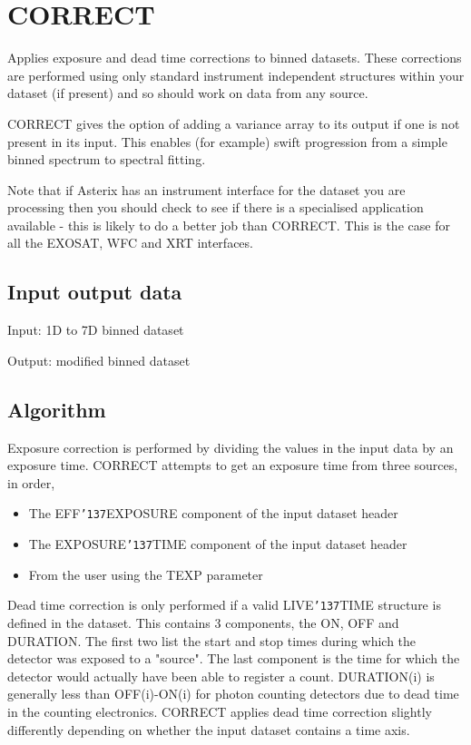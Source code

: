 \documentclass{book}
\renewcommand{\_}{{\tt\char'137}}     %
\begin{document}
\section{CORRECT}
Applies exposure and dead time corrections to binned datasets. These
corrections are performed using only standard instrument independent
structures within your dataset (if present) and so should work on
data from any source.

CORRECT gives the option of adding a variance array to its output if
one is not present in its input. This enables (for example) swift
progression from a simple binned spectrum to spectral fitting.

Note that if Asterix has an instrument interface for the dataset you
are processing then you should check to see if there is a specialised
application available - this is likely to do a better job than CORRECT.
This is the case for all the EXOSAT, WFC and XRT interfaces.

\subsection{Input output data}
Input: 1D to 7D binned dataset

Output: modified binned dataset

\subsection{Algorithm}
Exposure correction is performed by dividing the values in the input
data by an exposure time. CORRECT attempts to get an exposure time from
three sources, in order,

\begin{itemize}
\item The EFF\_EXPOSURE component of the input dataset header
\item The EXPOSURE\_TIME component of the input dataset header
\item From the user using the TEXP parameter
\end{itemize}
Dead time correction is only performed if a valid LIVE\_TIME structure
is defined in the dataset. This contains 3 components, the ON, OFF and
DURATION. The first two list the start and stop times during which the
detector was exposed to a "source". The last component is the time for
which the detector would actually have been able to register a count.
DURATION(i) is generally less than OFF(i)-ON(i) for photon counting
detectors due to dead time in the counting electronics. CORRECT applies
dead time correction slightly differently depending on whether the
input dataset contains a time axis.
\end{document}
